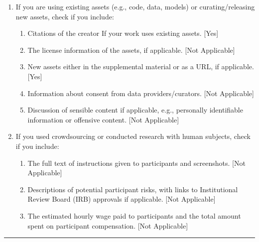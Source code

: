 \documentclass[twoside]{article}
\begin{document}
\begin{enumerate}
  \item If you are using existing assets (e.g., code, data, models) or curating/releasing new assets, check if you include:
  \begin{enumerate}
    \item Citations of the creator If your work uses existing assets. [Yes]
    \item The license information of the assets, if applicable. [Not Applicable]
    \item New assets either in the supplemental material or as a URL, if applicable. [Yes]
    \item Information about consent from data providers/curators. [Not Applicable]
    \item Discussion of sensible content if applicable, e.g., personally identifiable information or offensive content. [Not Applicable]
  \end{enumerate}

  \item If you used crowdsourcing or conducted research with human subjects, check if you include:
  \begin{enumerate}
    \item The full text of instructions given to participants and screenshots. [Not Applicable]
    \item Descriptions of potential participant risks, with links to Institutional Review Board (IRB) approvals if applicable. [Not Applicable]
    \item The estimated hourly wage paid to participants and the total amount spent on participant compensation. [Not Applicable]
  \end{enumerate}

\end{enumerate}



\clearpage
\appendix
\thispagestyle{empty}

\onecolumn
{}
\vspace{-40pt}
\startcontents[appendices]
\rule{\linewidth}{0.6pt}
\end{document}
